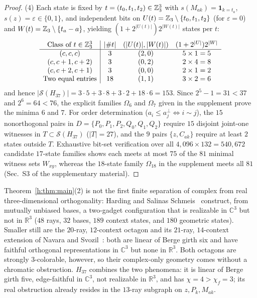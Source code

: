 \documentclass[aps,pra,reprint,superscriptaddress,longbibliography,nofootinbib,floatfix,10pt]{revtex4-2}
\theoremstyle{definition}\newtheorem{definition}[theorem]{Definition}
\theoremstyle{remark}\newtheorem{remark}[theorem]{Remark}
\newcommand{\C}{\mathbb C}\newcommand{\R}{\mathbb R}\newcommand{\Q}{\mathbb Q}
\newcommand{\Sc}{\mathcal S}\newcommand{\Cc}{\mathcal C}
\begin{document}
\begin{proof}
\label{h:sec:order-determination}
(4) Each state is fixed by $t=(t_0,t_1,t_2)\in\mathbb Z_3^3$ with $s(M_{ak})=\mathbf 1_{k=t_a}$, $s(z)=\varepsilon\in\{0,1\}$, and independent bits on $U(t)=\mathbb Z_3\setminus\{t_0,t_1,t_2\}$ (for $\varepsilon=0$) and $W(t)=\mathbb Z_3\setminus\{t_a-a\}$, yielding $(1+2^{|U(t)|})2^{|W(t)|}$ states per $t$:
\begin{equation}\label{h:eq:state-count-breakdown}
\begin{array}{c|ccc}
\text{Class of }t\in\mathbb Z_3^3 & |\#t| & (|U(t)|,|W(t)|) & (1+2^{|U|})2^{|W|}\\\hline
(c,c,c) & 3 & (2,0) & 5\times 1=5\\
(c,c+1,c+2) & 3 & (0,2) & 2\times 4=8\\
(c,c+2,c+1) & 3 & (0,0) & 2\times 1=2\\
\text{Two equal entries} & 18 & (1,1) & 3\times 2=6
\end{array}
\end{equation}
and hence $|\Sc(H_{37})|=3\cdot5+3\cdot8+3\cdot2+18\cdot6=153$. Since $2^5-1=31<37$ and $2^6=64<76$, the explicit families $\Omega_6$ and $\Omega_7$ given in the supplement prove the minima $6$ and $7$. For order determination ($a_i\le a_j^\perp\iff i\sim j$), the $15$ nonorthogonal pairs in $D=\{P_0,P_1,P_2,Q_0,Q_1,Q_2\}$ require $15$ disjoint joint-one witnesses in $T\subset\Sc(H_{37})$ ($|T|=27$), and the $9$ pairs $\{z,C_{ak}\}$ require at least $2$ states outside $T$. Exhaustive bit-set verification over all $4{,}096\times 132=540{,}672$ candidate $17$-state families shows each meets at most $75$ of the $81$ minimal witness sets $W_{xy}$, whereas the $18$-state family $\Omega_{18}$ in the supplement meets all $81$ (Sec.~S3 of the supplementary material).
\end{proof}

Theorem~\ref{h:thm:main}(2) is not the first finite separation of complex from real three-dimensional orthogonality: Harding and Salinas Schmeis~\cite[Thm.~2.6]{harding2025remarksIJTP} construct, from mutually unbiased bases, a two-gadget configuration that is realizable in $\C^3$ but not in $\R^3$ ($48$ rays, $32$ bases, $189$ context states, and $180$ geometric states). Smaller still are the $20$-ray, $12$-context octagon and its $21$-ray, $14$-context extension of Navara and Svozil~\cite{2026-Navara-Svozil-complex-only-3d-hypergraphs}: both are linear of Berge girth six and have faithful orthogonal representations in $\C^3$ but none in $\R^3$. Both octagons are strongly $3$-colorable, however, so their complex-only geometry comes without a chromatic obstruction. $H_{37}$ combines the two phenomena: it is linear of Berge girth five, edge-faithful in $\C^3$, not realizable in $\R^3$, and has $\chi=4>\chi_f=3$; its real obstruction already resides in the $13$-ray subgraph on $z,P_k,M_{ak}$.
\end{document}
